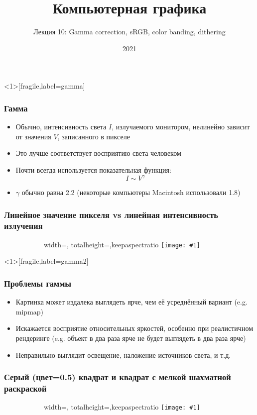 \documentclass{beamer}
\title{Компьютерная графика}
\subtitle{Лекция 10: Gamma correction, sRGB, color banding, dithering}
\date{2021}
\newcommand{\slideimage}[1]{
  \begin{figure}
    \begin{adjustbox}{width=\textwidth, totalheight=\textheight-2\baselineskip-2\baselineskip,keepaspectratio}
      \texttt{[image: \#1]}
    \end{adjustbox}
  \end{figure}
}
\begin{document}
\frame{\titlepage}

\begin{frame}<1>[fragile,label=gamma]
\frametitle{Гамма}
\begin{itemize}
\item Обычно, интенсивность света \begin{math}I\end{math}, излучаемого монитором, нелинейно зависит от значения \begin{math}V\end{math}, записанного в пикселе
\pause
\item Это лучше соответствует восприятию света человеком
\pause
\item Почти всегда используется показательная функция:
\begin{equation}I \sim V^\gamma\end{equation}
\pause
\item \begin{math}\gamma\end{math} обычно равна 2.2 (некоторые компьютеры Macintosh использовали 1.8)
\end{itemize}
\end{frame}

\begin{frame}
\frametitle{Линейное значение пикселя vs линейная интенсивность излучения}
\begin{figure}
\slideimage{gamma-scale.png}
\end{figure}
\end{frame}


\begin{frame}<1>[fragile,label=gamma2]
\frametitle{Проблемы гаммы}
\begin{itemize}
\item Картинка может издалека выглядеть ярче, чем её усреднённый вариант (e.g. mipmap)
\pause
\item Искажается восприятие относительных яркостей, особенно при реалистичном рендеринге (e.g. объект в два раза ярче не будет выглядеть в два раза ярче)
\pause
\item Неправильно выглядит освещение, наложение источников света, и т.д.
\end{itemize}
\end{frame}

\begin{frame}
\frametitle{Серый (цвет=0.5) квадрат и квадрат с мелкой шахматной раскраской}
\begin{figure}
\slideimage{gamma-checkers.png}
\end{figure}
\end{frame}
\end{document}

